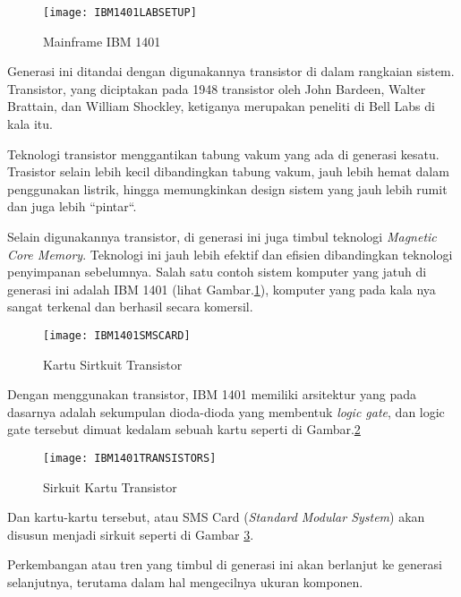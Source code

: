 \begin{figure}[h]
    \centering
    \texttt{[image: IBM1401LABSETUP]}
    \caption{Mainframe IBM 1401}
    \label{fig:IBM1401LABSETUP}
\end{figure}

Generasi ini ditandai dengan digunakannya transistor di dalam rangkaian sistem.
Transistor, yang diciptakan pada 1948 transistor oleh John Bardeen,
Walter Brattain, dan William Shockley, ketiganya merupakan
peneliti di Bell Labs di kala itu.

Teknologi transistor menggantikan tabung vakum yang ada di generasi kesatu. Trasistor
selain lebih kecil dibandingkan tabung vakum, jauh lebih hemat dalam penggunakan listrik,
hingga memungkinkan design sistem yang jauh lebih rumit dan juga lebih ``pintar``.

Selain digunakannya transistor, di generasi ini juga timbul teknologi \textit{Magnetic Core Memory}.
Teknologi ini jauh lebih efektif dan efisien dibandingkan teknologi penyimpanan sebelumnya.
\newpage
Salah satu contoh sistem komputer yang jatuh di generasi ini adalah IBM 1401 (lihat Gambar.\ref{fig:IBM1401LABSETUP}), komputer yang pada kala nya
sangat terkenal dan berhasil secara komersil.

\begin{figure}[h]
    \centering
    \texttt{[image: IBM1401SMSCARD]}
    \caption{Kartu Sirtkuit Transistor}
    \label{fig:IBM1401SMSCARD}
\end{figure}

Dengan menggunakan transistor, IBM 1401 memiliki arsitektur yang pada dasarnya adalah sekumpulan dioda-dioda
yang membentuk \textit{logic gate}, dan logic gate tersebut dimuat kedalam sebuah kartu seperti di Gambar.\ref{fig:IBM1401SMSCARD}

\begin{figure}[h]
    \centering
    \texttt{[image: IBM1401TRANSISTORS]}
    \caption{Sirkuit Kartu Transistor}
    \label{fig:IBM1401TRANSISTORS}
\end{figure}

Dan kartu-kartu tersebut, atau SMS Card (\textit{Standard Modular System}) akan disusun menjadi sirkuit seperti di Gambar \ref{fig:IBM1401TRANSISTORS}.

Perkembangan atau tren yang timbul di generasi ini akan berlanjut ke generasi selanjutnya, terutama dalam hal mengecilnya ukuran komponen.

